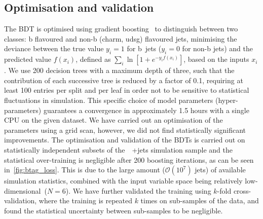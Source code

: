 \subsection{Optimisation and validation}
The BDT is optimised using gradient boosting~\cite{friedman2001greedy} to distinguish between two classes: b flavoured and non-b (charm, udsg) flavoured jets, minimising the deviance between the true value $y_i = 1$ for b~jets ($y_i = 0$ for non-b jets) and the predicted value $f(x_i)$, defined as $\sum_i \ln{[1 + e^{-y_i f(x_i)}]}$, based on the inputs $x_i$. We use 200 decision trees with a maximum depth of three, such that the contribution of each successive tree is reduced by a factor of 0.1, requiring at least 100 entries per split and per leaf in order not to be sensitive to statistical fluctuations in simulation. This specific choice of model parameters (hyper-parameters) guarantees a convergence in approximately 1.5 hours with a single CPU on the given dataset. We have carried out an optimisation of the parameters using a grid scan, however, we did not find statistically significant improvements.
The optimisation and validation of the BDTs is carried out on statistically independent subsets of the~\ttbar~+jets simulation sample and the statistical over-training is negligible after 200 boosting iterations, as can be seen in~\cref{fig:btag_loss}. This is due to the large amount ($\mathcal{O}(10^7)$ jets) of available simulation statistics, combined with the input variable space being relatively low-dimensional~($N=6$). We have further validated the training using $k$-fold cross-validation, where the training is repeated $k$ times on sub-samples of the data, and found the statistical uncertainty between sub-samples to be negligible.

